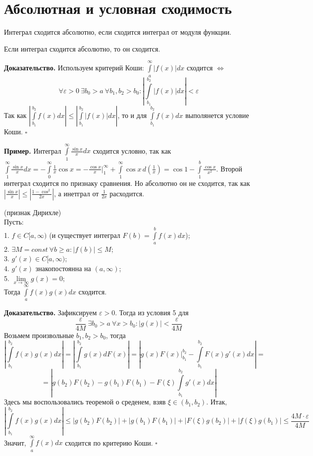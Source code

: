 \section{Абсолютная и условная сходимость}
\begin{defin}
Интеграл сходится абсолютно, если сходится интеграл от модуля функции.
\end{defin}

\begin{theor}
    Если интеграл сходится абсолютно, то он сходится.
\end{theor}
\textbf{Доказательство.}  Используем критерий Коши: 
$\int\limits_{a}^{\infty}|f(x)|dx$ сходится $\Leftrightarrow$
$$\forall \varepsilon>0~\exists b_0>a~\forall b_1,b_2>b_0:
\left| \int\limits_{b_1}^{b_2}|f(x)|dx \right|<\varepsilon$$
Так как $\left| \int\limits_{b_1}^{b_2}f(x)dx \right|\leqslant 
\left| \int\limits_{b_1}^{b_2}|f(x)|dx \right|$, то и для
$\int\limits_{b_1}^{b_2}f(x)dx$ выполянется условие Коши. $\square$ 

\textbf{Пример.} Интеграл $\int\limits_{1}^{\infty}\frac{\sin x}{x}dx$ 
сходится условно, так как 
$\int\limits_{1}^{\infty}\frac{\sin x}{x}dx=-\int\limits_{0}^{\infty}
\frac{1}{x}\cos x=-\frac{\cos x}{x}\bigg|^\infty_1+
\int\limits_{1}^{\infty}\cos x\,d(\frac{1}{x})=\cos 1-\int\limits_{1}^{b}
\frac{\cos x}{x^2}$. Второй интеграл сходится по признаку сравнения. 
Но абсолютно он не сходится, так как 
$\left| \frac{\sin x}{x} \right|\leqslant \left| \frac{1-\cos^2}{2x} \right|$,
а инетграл от $\frac{1}{2x}$ расходится. 


\begin{theor}
    (признак Дирихле)\\
    Пусть:\\
    1. $f\in C[a,\infty)$ 
    (и существует интеграл $F(b)=\int\limits_{a}^{b}f(x)dx$);\\
    2. $\exists M=const~\forall b\geqslant a:|f(b)|\leqslant M$;\\
    3. $g'(x)\in C[a,\infty)$;\\
    4. $g'(x)$ знакопостоянна на $(a,\infty)$;\\
    5. $\lim\limits_{x \to \infty}g(x)=0$;\\
    Тогда $\int\limits_{a}^{\infty}f(x)g(x)dx$ сходится. 
\end{theor}
\textbf{Доказательство.} Зафиксируем $\varepsilon>0$. Тогда из условия 5 для
$$\frac{\varepsilon}{4M}~\exists b_0>a~\forall x>b_0:|g(x)|<
\frac{\varepsilon}{4M}$$
Возьмем произвольные $b_1,b_2>b_0$, тогда 
$$\left|\int\limits_{b_1}^{b_2}f(x)g(x)dx\right| =
\left|\int\limits_{b_1}^{b_2}g(x)dF(x)\right| = 
\left| g(x)F(x)\bigg|^{b_2}_{b_1} - \int\limits_{b_1}^{b_2}F(x)g'(x)dx\right|= 
$$
$$
= \left|g(b_2)F(b_2) - g(b_1)F(b_1) - F(\xi)\int\limits_{b_1}^{b_2}g'(x)dx
\right|$$ 
Здесь мы воспользовались теоремой о среденем, взяв $\xi\in(b_1,b_2)$. 
Итак, 
$$ \left| \int\limits_{b_1}^{b_2} f(x)g(x)dx \right|\leqslant 
|g(b_2)F(b_2)|+|g(b_1)F(b_1)|+|F(\xi)g(b_2)|+
|f(\xi)g(b_1)|\leqslant\frac{4M\cdot \varepsilon}{4M}$$ 
Значит, $\int\limits_{a}^{\infty}f(x)dx$ сходится по критерию Коши. $\square$ 

